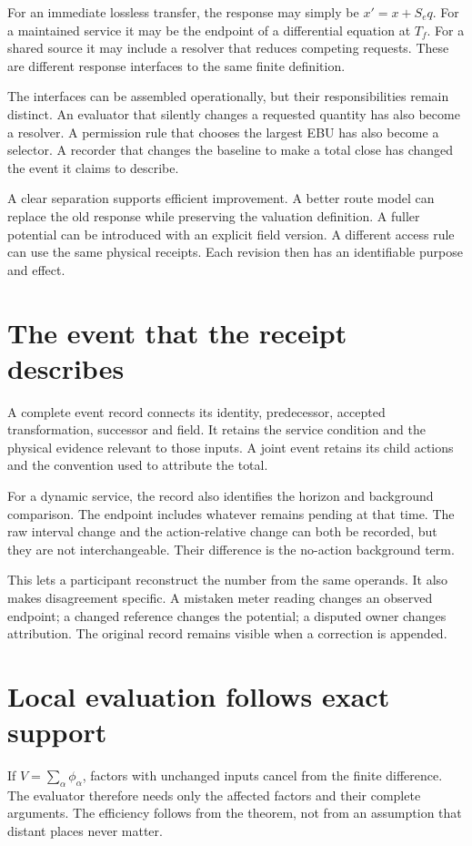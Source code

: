 For an immediate lossless transfer, the response may simply be $x'=x+S_eq$. For a maintained service it may be the endpoint of a differential equation at $T_f$. For a shared source it may include a resolver that reduces competing requests. These are different response interfaces to the same finite definition.

The interfaces can be assembled operationally, but their responsibilities remain distinct. An evaluator that silently changes a requested quantity has also become a resolver. A permission rule that chooses the largest EBU has also become a selector. A recorder that changes the baseline to make a total close has changed the event it claims to describe.

A clear separation supports efficient improvement. A better route model can replace the old response while preserving the valuation definition. A fuller potential can be introduced with an explicit field version. A different access rule can use the same physical receipts. Each revision then has an identifiable purpose and effect.

\section{The event that the receipt describes}
A complete event record connects its identity, predecessor, accepted transformation, successor and field. It retains the service condition and the physical evidence relevant to those inputs. A joint event retains its child actions and the convention used to attribute the total.

For a dynamic service, the record also identifies the horizon and background comparison. The endpoint includes whatever remains pending at that time. The raw interval change and the action-relative change can both be recorded, but they are not interchangeable. Their difference is the no-action background term.

This lets a participant reconstruct the number from the same operands. It also makes disagreement specific. A mistaken meter reading changes an observed endpoint; a changed reference changes the potential; a disputed owner changes attribution. The original record remains visible when a correction is appended.

\section{Local evaluation follows exact support}
If $V=\sum_\alpha\phi_\alpha$, factors with unchanged inputs cancel from the finite difference. The evaluator therefore needs only the affected factors and their complete arguments. The efficiency follows from the theorem, not from an assumption that distant places never matter.

